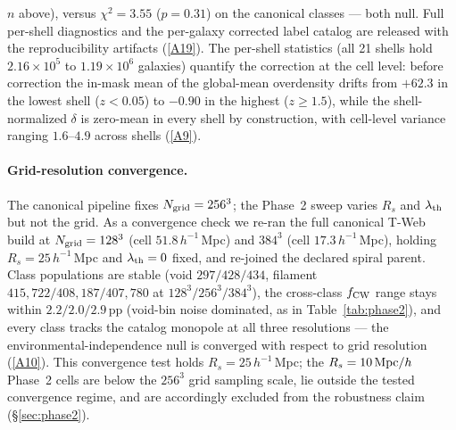 \documentclass[aps,prd,twocolumn,superscriptaddress,showpacs,preprintnumbers,nofootinbib,longbibliography,floatfix]{revtex4-2}
\newcommand{\repoBase}{https://github.com/Hubify-Projects/bigbounce/blob/main}
\begin{document}
$n$ above), versus $\chi^2 = 3.55$ ($p = 0.31$) on
the canonical classes — both null. Full per-shell diagnostics and
the per-galaxy
corrected label catalog are released with the reproducibility
artifacts
(\href{\repoBase/pipelines/p5\_desi\_chirality/outputs/16\_cosmic\_web\_zshell\_corrected.json}{[A19]}).
The per-shell statistics (all 21 shells hold $2.16\times10^{5}$ to
$1.19\times10^{6}$ galaxies) quantify the correction at the cell
level: before correction the in-mask mean of the global-mean
overdensity drifts from $+62.3$ in the lowest shell ($z<0.05$) to
$-0.90$ in the highest ($z \geq 1.5$), while the shell-normalized
$\delta$ is zero-mean in every shell by construction, with cell-level
variance ranging $1.6$--$4.9$ across shells
(\href{\repoBase/pipelines/p5\_desi\_chirality/outputs/22\_r24conf\_local\_batch.json}{[A9]}).

\paragraph{Grid-resolution convergence.} The canonical pipeline fixes
$N_{\rm grid} = 256^3$; the Phase~2 sweep varies $R_s$ and
$\lambda_{\rm th}$ but not the grid. As a convergence check we re-ran
the full canonical T-Web build at $N_{\rm grid} = 128^3$ (cell
$51.8\,h^{-1}$\,Mpc) and $384^3$ (cell $17.3\,h^{-1}$\,Mpc), holding
$R_s = 25\,h^{-1}$\,Mpc and $\lambda_{\rm th} = 0$ fixed, and re-joined
the declared spiral parent. Class populations are stable (void
$297/428/434$, filament $415{,}722/408{,}187/407{,}780$ at
$128^3/256^3/384^3$), the cross-class $f_{\rm CW}$ range stays within
$2.2/2.0/2.9$\,pp (void-bin noise dominated, as in
Table~\ref{tab:phase2}), and every class tracks the catalog monopole
at all three resolutions — the environmental-independence null is
converged with respect to grid resolution
(\href{\repoBase/pipelines/p5\_desi\_chirality/outputs/17\_v0151\_closure\_recomputes.json}{[A10]}).
This convergence test holds $R_s = 25\,h^{-1}$\,Mpc; the
$R_s = 10\,{\rm Mpc}/h$ Phase~2 cells are below the $256^3$ grid
sampling scale, lie outside the tested convergence regime, and are
accordingly excluded from the robustness claim
(\S\ref{sec:phase2}).
\end{document}
